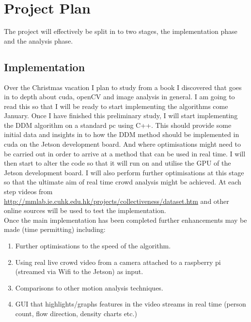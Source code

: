\documentclass[11pt]{article}
\begin{document}
\section{Project Plan}
The project will effectively be split in to two stages, the implementation phase and the analysis phase.

\subsection{Implementation}
Over the Christmas vacation I plan to study from a book I discovered that goes in to depth about cuda, openCV and image analysis in general.\cite{cuda_book}
I am going to read this so that I will be ready to start implementing the algorithms come January.
Once I have finished this preliminary study, I will start implementing the DDM algorithm on a standard pc using C++.
This should provide some initial data and insights in to how the DDM method should be implemented in cuda on the Jetson development board.
And where optimisations might need to be carried out in order to arrive at a method that can be used in real time.
I will then start to alter the code so that it will run on and utilise the GPU of the Jetson development board.
I will also perform further optimisations at this stage so that the ultimate aim of real time crowd analysis might be achieved.
At each step videos from \url{http://mmlab.ie.cuhk.edu.hk/projects/collectiveness/dataset.htm}\cite{crowdMotionDB} and other online sources will be used to test the implementation.
\\
Once the main implementation has been completed further enhancements may be made (time permitting) including:
\begin{enumerate}
\item Further optimisations to the speed of the algorithm.
\item Using real live crowd video from a camera attached to a raspberry pi (streamed via Wifi to the Jetson) as input.
\item Comparisons to other motion analysis techniques.
\item GUI that highlights/graphs features in the video streams in real time (person count, flow direction, density charts etc.)
\end{enumerate}
\end{document}
